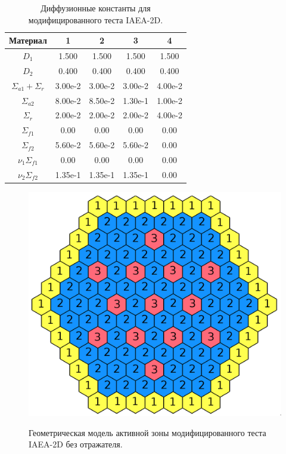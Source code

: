\begin{table}[H]
\caption{\label{tab:canonsummary}Диффузионные константы для модифицированного теста IAEA-2D.}
\label{t1}
\begin{center}
\begin{tabular}{|c|c|c|c|c|}
\hline
Материал & 1 & 2 & 3 & 4\\
\hline 
$D_1$ & 1.500 & 1.500 & 1.500 & 1.500\\
\hline 
$D_2$ & 0.400 & 0.400 & 0.400 & 0.400\\
\hline 
$\Sigma_{a1} + \Sigma_r$ & 3.00e-2 & 3.00e-2 & 3.00e-2 & 4.00e-2\\
\hline
$\Sigma_{a2}$ & 8.00e-2 & 8.50e-2 & 1.30e-1 & 1.00e-2\\
\hline
$\Sigma_r$ & 2.00e-2 & 2.00e-2 & 2.00e-2 & 4.00e-2\\
\hline
$\Sigma_{f1}$ & 0.00 & 0.00 & 0.00 & 0.00\\
\hline
$\Sigma_{f2}$ & 5.60e-2 & 5.60e-2 & 5.60e-2 & 0.00\\
\hline
$\nu_1\Sigma_{f1}$ & 0.00 & 0.00 & 0.00 & 0.00\\
\hline
$\nu_2\Sigma_{f2}$ & 1.35e-1 & 1.35e-1 & 1.35e-1 & 0.00\\
\hline
\end{tabular}
\end{center}
\end{table}
\begin{figure}[H]
	\includegraphics[width=0.85\linewidth]{iaea.png}\\
	\caption{\label{image:canonsummary}Геометрическая модель активной зоны модифицированного теста IAEA-2D без отражателя.}
	\label{ris:iaea}
\end{figure}
